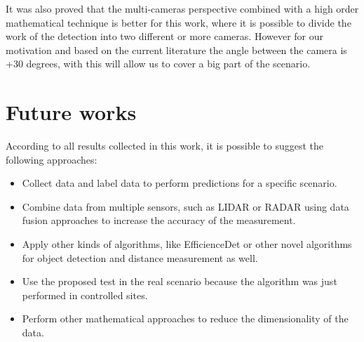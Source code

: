 It was also proved that the multi-cameras perspective combined with a high order mathematical technique is better for this work, where it is possible to divide the work of the detection into two different or more cameras. However for our motivation and based on the current literature the angle between the camera is +30 degrees, with this will allow us to cover a big part of the scenario.   

\section{Future works}

According to all results collected in this work, it is possible to suggest the following approaches:

\begin{itemize}
    \item Collect data and label data to perform predictions for a specific scenario.
    \item Combine data from multiple sensors, such as LIDAR or RADAR using data fusion approaches to increase the accuracy of the measurement. 
    \item Apply other kinds of algorithms, like EfficienceDet or other novel algorithms for object detection and distance measurement as well.
    \item Use the proposed test in the real scenario because the algorithm was just performed in controlled sites. 
    \item Perform other mathematical approaches to reduce the dimensionality of the data.
\end{itemize}